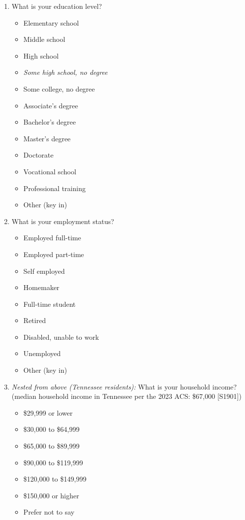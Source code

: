 \documentclass{article}
\begin{document}
\begin{enumerate}
\item What is your education level?
\begin{itemize}
  \item[\checkbox] Elementary school
  \item[\checkbox] Middle school
  \item[\checkbox] High school
  \item[\checkbox] \textit{Some high school, no degree}
  \item[\checkbox] Some college, no degree
  \item[\checkbox] Associate's degree
  \item[\checkbox] Bachelor's degree
  \item[\checkbox] Master's degree
  \item[\checkbox] Doctorate
  \item[\checkbox] Vocational school
  \item[\checkbox] Professional training
  \item[\checkbox] Other (key in)
\end{itemize}
 

\item What is your employment status?
\begin{itemize}
  \item[\checkbox] Employed full-time
  \item[\checkbox] Employed part-time
  \item[\checkbox] Self employed
  \item[\checkbox] Homemaker
  \item[\checkbox] Full-time student
  \item[\checkbox] Retired
  \item[\checkbox] Disabled, unable to work
  \item[\checkbox] Unemployed
  \item[\checkbox] Other (key in)
\end{itemize}
 

\item \textit{Nested from above (Tennessee residents):} What is your household income?
(median household income in Tennessee per the 2023 ACS: \$67,000 [S1901])
\begin{itemize}
  \item[\checkbox] \$29,999 or lower
  \item[\checkbox] \$30,000 to \$64,999
  \item[\checkbox] \$65,000 to \$89,999
  \item[\checkbox] \$90,000 to \$119,999
  \item[\checkbox] \$120,000 to \$149,999
  \item[\checkbox] \$150,000 or higher
  \item[\checkbox] Prefer not to say
\end{itemize}
 


\end{enumerate}
\end{document}
